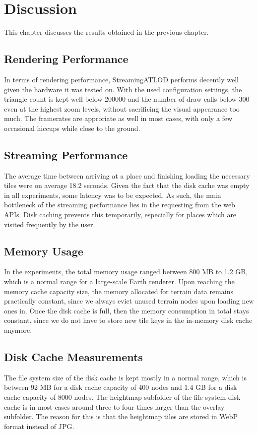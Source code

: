 \chapter{Discussion}
This chapter discusses the results obtained in the previous chapter.

\section{Rendering Performance}
In terms of rendering performance, StreamingATLOD performs decently well
given the hardware it was tested on.
With the used configuration settings, the triangle count is kept well below 200000 and the number of draw calls below 
300 even at the highest zoom levels, without 
sacrificing the visual appearance too much.
The framerates are approriate as well in most cases, with only a few occasional hiccups 
while close to the ground.

\section{Streaming Performance}
The average time between arriving at a place and finishing loading the necessary tiles were on average 
18.2 seconds. Given the fact that the disk cache was empty in all experiments, some latency was to be expected.
As such, the main bottleneck of the streaming performance lies in the requesting from the web APIs.
Disk caching prevents this temporarily, especially
for places which are visited frequently by the user.

\section{Memory Usage}
In the experiments, the total memory usage ranged between 800 MB to 1.2 GB, 
which is a normal range for a large-scale Earth renderer.
Upon reaching the memory cache capacity size, the 
memory allocated for terrain data remains practically constant,
since we always evict unused terrain nodes upon loading new ones in.
Once the disk cache is full, then the memory consumption in total stays constant,
since we do not have to store new tile keys in the in-memory disk cache anymore.

\section{Disk Cache Measurements}
The file system size of the disk cache is kept mostly in a normal range,
which is between 92 MB for a disk cache capacity of 400 nodes 
and 1.4 GB for a disk cache capacity of 8000 nodes.
The heightmap subfolder of the file system disk cache 
is in most cases around three to four times 
larger than the overlay subfolder. The reason 
for this is that the heightmap tiles are stored 
in WebP format instead of JPG.


